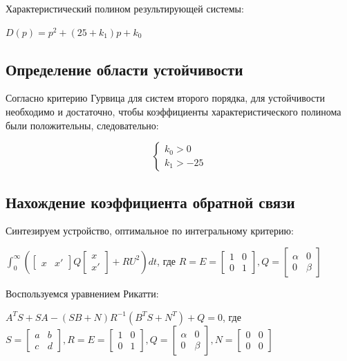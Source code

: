 \documentclass[14pt,a4paper,report]{report}
\begin{document}
Характеристический полином результирующей системы:

$D(p)=p^2+(25+k_1)p+k_0$

\subsection{Определение области устойчивости}

Согласно критерию Гурвица для систем второго порядка, для устойчивости необходимо и достаточно, чтобы коэффициенты характеристического полинома были положительны, следовательно:

\begin{equation*}
\begin{cases}
	\text{$k_0>0$} \\
	\text{$k_1>-25$}
\end{cases}
\end{equation*}

\subsection{Нахождение коэффициента обратной связи}

Синтезируем устройство, оптимальное по интегральному критерию:

$\int_{0}^{\infty}(\begin{bmatrix}
x & x' 
\end{bmatrix}Q\begin{bmatrix}
x \\
x' 
\end{bmatrix}+RU^2)dt
$, где $R=E=\begin{bmatrix}
1 & 0 \\
0 & 1 
\end{bmatrix}, Q=\begin{bmatrix}
\alpha & 0 \\
0 & \beta 
\end{bmatrix}$

Воспользуемся уравнением Рикатти:

$A^TS+SA-(SB+N)R^{-1}(B^TS+N^T)+Q=0$, где $ S=\begin{bmatrix}
a & b \\
c & d 
\end{bmatrix}, R=E=\begin{bmatrix}
	1 & 0 \\
	0 & 1 
\end{bmatrix}, Q=\begin{bmatrix}
\alpha & 0 \\
0 & \beta 
\end{bmatrix}, N=\begin{bmatrix}
0 & 0 \\
0 & 0 
\end{bmatrix}$
\end{document}
